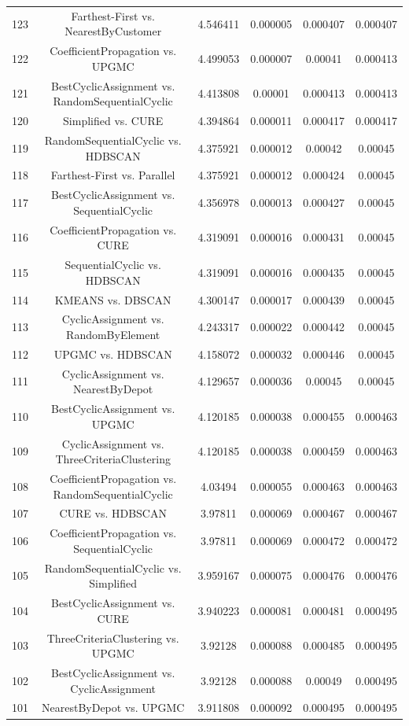 \documentclass[a4paper,10pt]{article}
\begin{document}
\begin{landscape}
\begin{table}[!htp]
\begin{tabular}{cccccc}
123&Farthest-First vs. NearestByCustomer&4.546411&0.000005&0.000407&0.000407\\
122&CoefficientPropagation vs. UPGMC&4.499053&0.000007&0.00041&0.000413\\
121&BestCyclicAssignment vs. RandomSequentialCyclic&4.413808&0.00001&0.000413&0.000413\\
120&Simplified vs. CURE&4.394864&0.000011&0.000417&0.000417\\
119&RandomSequentialCyclic vs. HDBSCAN&4.375921&0.000012&0.00042&0.00045\\
118&Farthest-First vs. Parallel&4.375921&0.000012&0.000424&0.00045\\
117&BestCyclicAssignment vs. SequentialCyclic&4.356978&0.000013&0.000427&0.00045\\
116&CoefficientPropagation vs. CURE&4.319091&0.000016&0.000431&0.00045\\
115&SequentialCyclic vs. HDBSCAN&4.319091&0.000016&0.000435&0.00045\\
114&KMEANS vs. DBSCAN&4.300147&0.000017&0.000439&0.00045\\
113&CyclicAssignment vs. RandomByElement&4.243317&0.000022&0.000442&0.00045\\
112&UPGMC vs. HDBSCAN&4.158072&0.000032&0.000446&0.00045\\
111&CyclicAssignment vs. NearestByDepot&4.129657&0.000036&0.00045&0.00045\\
110&BestCyclicAssignment vs. UPGMC&4.120185&0.000038&0.000455&0.000463\\
109&CyclicAssignment vs. ThreeCriteriaClustering&4.120185&0.000038&0.000459&0.000463\\
108&CoefficientPropagation vs. RandomSequentialCyclic&4.03494&0.000055&0.000463&0.000463\\
107&CURE vs. HDBSCAN&3.97811&0.000069&0.000467&0.000467\\
106&CoefficientPropagation vs. SequentialCyclic&3.97811&0.000069&0.000472&0.000472\\
105&RandomSequentialCyclic vs. Simplified&3.959167&0.000075&0.000476&0.000476\\
104&BestCyclicAssignment vs. CURE&3.940223&0.000081&0.000481&0.000495\\
103&ThreeCriteriaClustering vs. UPGMC&3.92128&0.000088&0.000485&0.000495\\
102&BestCyclicAssignment vs. CyclicAssignment&3.92128&0.000088&0.00049&0.000495\\
101&NearestByDepot vs. UPGMC&3.911808&0.000092&0.000495&0.000495\\

\end{tabular}
\end{table}
\end{landscape}
\end{document}
